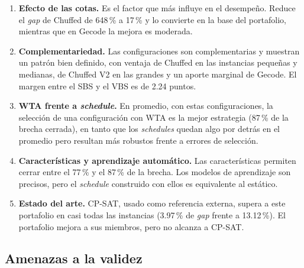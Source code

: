 \begin{enumerate}[label=\textbf{P\arabic*.}, leftmargin=*]
  \item \textbf{Efecto de las cotas.} Es el factor que más influye en el
    desempeño. Reduce el \textit{gap} de Chuffed de 648\,\% a 17\,\% y lo
    convierte en la base del portafolio, mientras que en Gecode la mejora es
    moderada.
  \item \textbf{Complementariedad.} Las configuraciones son complementarias y
    muestran un patrón bien definido, con ventaja de Chuffed en las instancias
    pequeñas y medianas, de Chuffed V2 en las grandes y un aporte marginal de
    Gecode. El margen entre el SBS y el VBS es de 2.24 puntos.
  \item \textbf{WTA frente a \textit{schedule}.} En promedio, con estas
    configuraciones, la selección de una configuración con WTA es la mejor estrategia (87\,\% de la brecha
    cerrada), en tanto que los \textit{schedules} quedan algo por detrás en el
    promedio pero resultan más robustos frente a errores de selección.
  \item \textbf{Características y aprendizaje automático.} Las características
    permiten cerrar entre el 77\,\% y el 87\,\% de la brecha. Los modelos de
    aprendizaje son precisos, pero el \textit{schedule} construido con ellos
    es equivalente al estático.
  \item \textbf{Estado del arte.} CP-SAT, usado como referencia externa,
    supera a este portafolio en casi todas las instancias (3.97\,\% de
    \textit{gap} frente a 13.12\,\%). El portafolio mejora a sus miembros,
    pero no alcanza a CP-SAT.
\end{enumerate}

\subsection{Amenazas a la validez}

